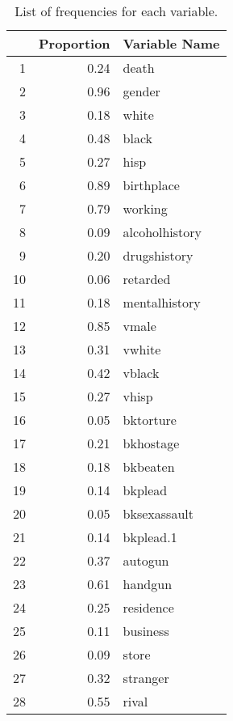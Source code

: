 \documentclass{article}
\begin{document}
\begin{table}[!htb]
\centering
\begin{tabular}{rrl}
  \hline
 & Proportion & Variable Name \\ 
  \hline
  1 & 0.24 & death \\ 
  2 & 0.96 & gender \\ 
  3 & 0.18 & white \\ 
  4 & 0.48 & black \\ 
  5 & 0.27 & hisp \\ 
  6 & 0.89 & birthplace \\ 
  7 & 0.79 & working \\ 
  8 & 0.09 & alcoholhistory \\ 
  9 & 0.20 & drugshistory \\ 
  10 & 0.06 & retarded \\ 
  11 & 0.18 & mentalhistory \\ 
  12 & 0.85 & vmale \\ 
  13 & 0.31 & vwhite \\ 
  14 & 0.42 & vblack \\ 
  15 & 0.27 & vhisp \\ 
  16 & 0.05 & bktorture \\ 
  17 & 0.21 & bkhostage \\ 
  18 & 0.18 & bkbeaten \\ 
  19 & 0.14 & bkplead \\ 
  20 & 0.05 & bksexassault \\ 
  21 & 0.14 & bkplead.1 \\ 
  22 & 0.37 & autogun \\ 
  23 & 0.61 & handgun \\ 
  24 & 0.25 & residence \\ 
  25 & 0.11 & business \\ 
  26 & 0.09 & store \\ 
  27 & 0.32 & stranger \\ 
  28 & 0.55 & rival \\ 
   \hline
\end{tabular}
\caption{List of frequencies for each variable.}
\label{table:props}
\end{table}


\newpage
\end{document}

